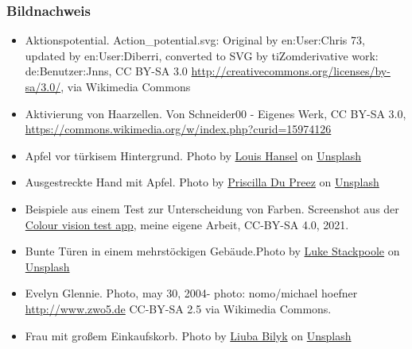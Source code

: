 \documentclass[aspectratio=169]{beamer}
\begin{document}
\begin{frame}
\frametitle{Bildnachweis}
\begin{tiny}



 
\begin{itemize}


\item
Aktionspotential. Action\_potential.svg: Original by en:User:Chris 73, updated by en:User:Diberri, converted to SVG by tiZomderivative work: de:Benutzer:Jnns, CC BY-SA 3.0 \url{http://creativecommons.org/licenses/by-sa/3.0/}, via Wikimedia Commons

\item
Aktivierung von Haarzellen. Von Schneider00 - Eigenes Werk, CC BY-SA 3.0, \url{https://commons.wikimedia.org/w/index.php?curid=15974126}

\item
Apfel vor türkisem Hintergrund. Photo by \href{https://unsplash.com/@louishansel?utm_source=unsplash&utm_medium=referral&utm_content=creditCopyText}{Louis Hansel} on \href{https://unsplash.com/s/photos/apple?utm_source=unsplash&utm_medium=referral&utm_content=creditCopyText}{Unsplash}
  
\item
Ausgestreckte Hand mit Apfel. Photo by \href{https://unsplash.com/@priscilladupreez?utm_source=unsplash&utm_medium=referral&utm_content=creditCopyText}{Priscilla Du Preez} on \href{https://unsplash.com/s/photos/apple?utm_source=unsplash&utm_medium=referral&utm_content=creditCopyText}{Unsplash}
  
  

\item
Beispiele aus einem Test zur Unterscheidung von Farben. Screenshot aus der \href{https://melamela.shinyapps.io/colour_vision/}{Colour vision test app}, meine eigene Arbeit, CC-BY-SA 4.0, 2021. 

\item
Bunte Türen in einem mehrstöckigen Gebäude.Photo by \href{https://unsplash.com/@withluke?utm_source=unsplash&utm_medium=referral&utm_content=creditCopyText}{Luke Stackpoole} on \href{https://unsplash.com/s/photos/colours?utm_source=unsplash&utm_medium=referral&utm_content=creditCopyText}{Unsplash}
  
\item
Evelyn Glennie. Photo, may 30, 2004- photo: nomo/michael hoefner \url{http://www.zwo5.de} CC-BY-SA 2.5 via Wikimedia Commons.

\item 
Frau mit großem Einkaufskorb. Photo by \href{https://unsplash.com/@ibilyk?utm_source=unsplash&utm_medium=referral&utm_content=creditCopyText}{Liuba Bilyk} on \href{https://unsplash.com/s/photos/carrying-groceries?utm_source=unsplash&utm_medium=referral&utm_content=creditCopyText}{Unsplash}
  

\end{itemize}
\end{tiny}
\end{frame}
\end{document}
